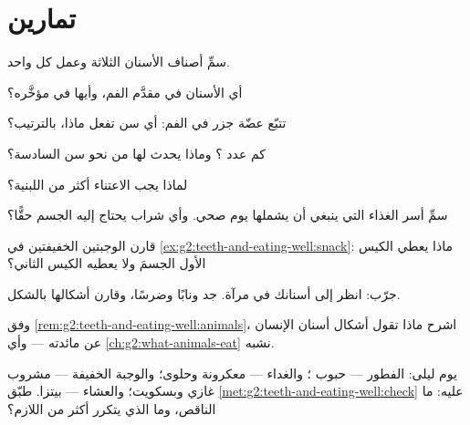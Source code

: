 \section{تمارين}

\begin{exercise}[$\star$]\label{exo:g2:teeth-and-eating-well:1}
سمِّ أصناف الأسنان الثلاثة وعمل كل واحد.
\end{exercise}

\begin{exercise}[$\star$]\label{exo:g2:teeth-and-eating-well:2}
أي الأسنان في مقدَّم الفم، وأيها في مؤخَّره؟
\end{exercise}

\begin{exercise}[$\star$]\label{exo:g2:teeth-and-eating-well:3}
تتبّع عضّة جزر في الفم: أي سن تفعل ماذا، بالترتيب؟
\end{exercise}

\begin{exercise}[$\star$]\label{exo:g2:teeth-and-eating-well:4}
كم عدد ؟ وماذا يحدث لها من نحو سن السادسة؟
\end{exercise}

\begin{exercise}[$\star$]\label{exo:g2:teeth-and-eating-well:5}
لماذا يجب الاعتناء  أكثر من اللبنية؟
\end{exercise}

\begin{exercise}[$\star$]\label{exo:g2:teeth-and-eating-well:6}
سمِّ أسر الغذاء التي ينبغي أن يشملها يوم صحي. وأي شراب يحتاج إليه
الجسم حقًّا؟
\end{exercise}

\begin{exercise}[$\star$]\label{exo:g2:teeth-and-eating-well:7}
قارن الوجبتين الخفيفتين في \cref{ex:g2:teeth-and-eating-well:snack}:
ماذا يعطي الكيس الأول الجسمَ ولا يعطيه الكيس الثاني؟
\end{exercise}

\begin{exercise}[$\star$]\label{exo:g2:teeth-and-eating-well:8}
جرّب: انظر إلى أسنانك في مرآة. جد  ونابًا وضرسًا، وقارن
أشكالها بالشكل.
\end{exercise}

\begin{exercise}[$\star\star$]\label{exo:g2:teeth-and-eating-well:9}
وفق \cref{rem:g2:teeth-and-eating-well:animals}، اشرح ماذا
تقول أشكال أسنان الإنسان عن مائدته --- وأي 
\cref{ch:g2:what-animals-eat} نشبه.
\end{exercise}

\begin{exercise}[$\star\star$]\label{exo:g2:teeth-and-eating-well:10}
يوم ليلى: الفطور --- حبوب ؛ والغداء --- معكرونة وحلوى؛
والوجبة الخفيفة --- مشروب غازي وبسكويت؛ والعشاء --- بيتزا. طبّق
\cref{met:g2:teeth-and-eating-well:check} عليه: ما الناقص، وما
الذي يتكرر أكثر من اللازم؟
\end{exercise}
